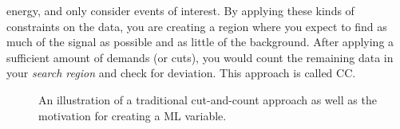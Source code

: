 energy, and only consider events of interest. By applying these kinds of constraints on the data, 
you are creating a region where you expect to find as much of the signal as possible and as little 
of the background. After applying a sufficient amount of demands (or cuts), you would count the 
remaining data in your \emph{search region} and check for deviation. This approach is called \ac{CC}.
\\
\begin{figure} 
    \centering
    \caption{An illustration of a traditional cut-and-count approach as well 
    as the motivation for creating a \ac{ML} variable.}
    \label{fig:overlap}
\end{figure}
